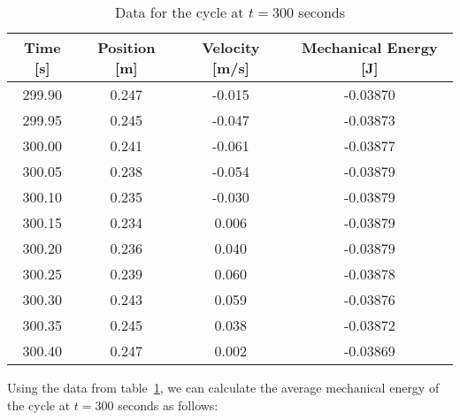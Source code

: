 \documentclass{article}
\begin{document}
            \begin{table}[H]
                \centering
                \begin{tabular}{|c|c|c|c|}
                    \hline
                    Time [s] & Position [m] & Velocity [m/s] & Mechanical Energy [J] \\
                    \hline
                    299.90   & 0.247        & -0.015         & -0.03870              \\
                    \hline
                    299.95   & 0.245        & -0.047         & -0.03873              \\
                    \hline
                    300.00   & 0.241        & -0.061         & -0.03877              \\
                    \hline
                    300.05   & 0.238        & -0.054         & -0.03879              \\
                    \hline
                    300.10   & 0.235        & -0.030         & -0.03879              \\
                    \hline
                    300.15   & 0.234        & 0.006          & -0.03879              \\
                    \hline
                    300.20   & 0.236        & 0.040          & -0.03879              \\
                    \hline
                    300.25   & 0.239        & 0.060          & -0.03878              \\
                    \hline
                    300.30   & 0.243        & 0.059          & -0.03876              \\
                    \hline
                    300.35   & 0.245        & 0.038          & -0.03872              \\
                    \hline
                    300.40   & 0.247        & 0.002          & -0.03869              \\
                    \hline
                \end{tabular} %
                \caption{Data for the cycle at $t=300$ seconds}\label{tab:cycle-at-300-seconds-mechanical-energy-table}
            \end{table}
            
            Using the data from table~\ref{tab:cycle-at-300-seconds-mechanical-energy-table}, we can calculate the average mechanical energy of the cycle at $t=300$ seconds as follows:
            
\end{document}

